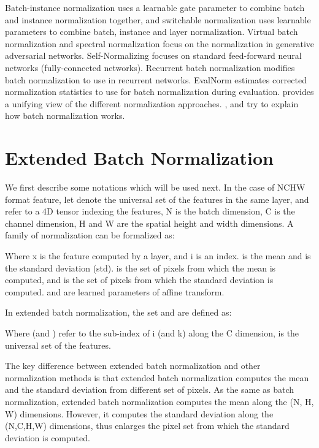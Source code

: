 \documentclass[runningheads]{llncs}
\begin{document}
Batch-instance normalization \cite{nam2018batch} uses a learnable gate parameter to combine batch and instance normalization together, and switchable normalization \cite{luo2018differentiable}  uses learnable parameters to combine batch, instance and layer normalization.
Virtual batch normalization \cite{salimans2016improved} and spectral normalization \cite{miyato2018spectral} focus on the normalization in generative adversarial networks. 
Self-Normalizing \cite{klambauer2017self} focuses on standard feed-forward neural networks (fully-connected networks).
Recurrent batch normalization \cite{cooijmans2016recurrent} modifies batch normalization to use in recurrent networks. 
EvalNorm \cite{singh2019evalnorm} estimates corrected normalization statistics to use for batch normalization during evaluation. \cite{ren2016normalizing} provides a unifying view of the different normalization approaches. 
\cite{santurkar2018does}, \cite{luo2018towards} and \cite{bjorck2018understanding} try to explain how batch normalization works.


\section{Extended Batch Normalization}
We first describe some notations which will be used next. In the case of NCHW format feature, let  denote the universal set of the features in the same layer, and  refer to a 4D tensor indexing the features, N is the batch dimension, C is the channel dimension, H and W are the spatial height and width dimensions. A family of normalization can be formalized as:




Where x is the feature computed by a layer, and i is an index. 
 is the mean and  is the standard deviation (std).  is the set of pixels from which the mean is computed, and  is the set of pixels from which the standard deviation is computed.  and  are learned parameters of affine transform.

In extended batch normalization, the set  and  are defined as:



Where  (and ) refer to the sub-index of i (and k) along the C dimension,  is the universal set of the features.

The key difference between extended batch normalization and other normalization methods is that extended batch normalization computes the mean and the standard deviation from different set of pixels. As the same as batch normalization, extended batch normalization computes the mean along the (N, H, W) dimensions. However, it computes the standard deviation along the (N,C,H,W) dimensions, thus enlarges the pixel set from which the standard deviation is computed.
\end{document}
